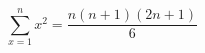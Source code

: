 \documentclass{article}
\begin{document}
\Large{
$$ \sum_{x=1}^ n  x^2 = \frac{n(n+1)(2n+1)}{6} $$
}
\end{document}
